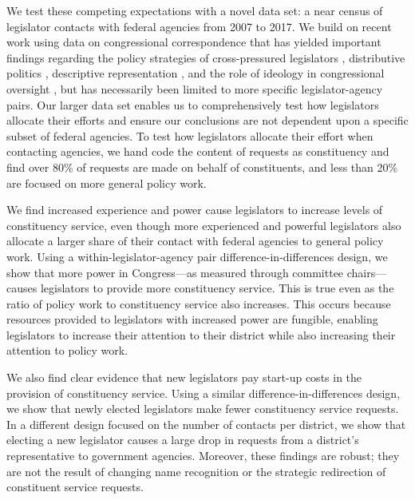 \documentclass[12pt]{article}
\begin{document}
We test these competing expectations with a novel data set: a near census of legislator contacts with federal agencies from 2007 to 2017. We build on recent work using data on congressional correspondence that has yielded important findings regarding the policy strategies of cross-pressured legislators \citep{Ritchie2017}, distributive politics \citep{MillsKalafHuges2015}, descriptive representation \citep{LowandeRitchieLauterbach2018}, and the role of ideology in congressional oversight \citep{Lowande2018JOP}, but has necessarily been limited to more specific legislator-agency pairs. Our larger data set enables us to comprehensively test how legislators allocate their efforts and ensure our conclusions are not dependent upon a specific subset of federal agencies. To test how legislators allocate their effort when contacting agencies, we hand code the content of  requests as constituency and find over 80\% of requests are made on behalf of constituents, and less than 20\% are focused on more general policy work. 

We find increased experience and power cause legislators to increase levels of constituency service, even though more experienced and powerful legislators also allocate a larger share of their contact with federal agencies to general policy work. 
Using a within-legislator-agency pair difference-in-differences design, we show that more power in Congress---as measured through committee chairs---causes legislators to provide more constituency service. This is true even as the ratio of policy work to constituency service also increases. This occurs because resources provided to legislators with increased power are fungible, enabling legislators to increase their attention to their district while also increasing their attention to policy work.  

We also find clear evidence that new legislators pay start-up costs in the provision of constituency service. Using a similar difference-in-differences design, we show that newly elected legislators make fewer constituency service requests. In a different design focused on the number of contacts per district, we show that electing a new legislator causes a large drop in requests from a district's representative to government agencies.
Moreover, these findings are robust; they are not the result of changing name recognition or the strategic redirection of constituent service requests.  
 
\end{document}
